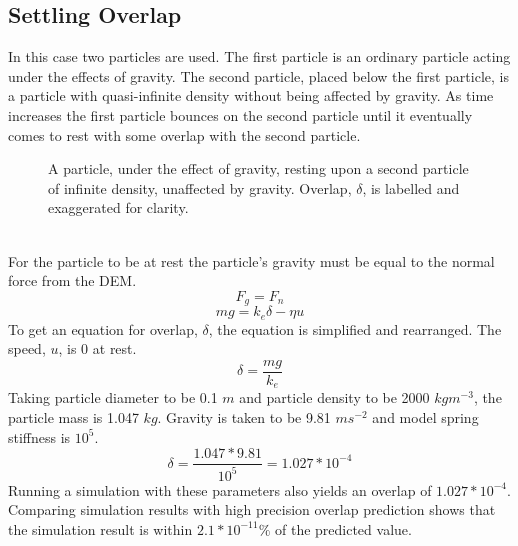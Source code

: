 \documentclass[10pt,a4paper,titlepage]{report}
\begin{document}
\subsection{Settling Overlap}
In this case two particles are used. The first particle is an ordinary particle acting under the effects of gravity. The second particle, placed below the first particle, is a particle with quasi-infinite density without being affected by gravity. As time increases the first particle bounces on the second particle until it eventually comes to rest with some overlap with the second particle.\\
\begin{figure}[!htb]
\centering
{}
\caption{A particle, under the effect of gravity, resting upon a second particle of infinite density, unaffected by gravity. Overlap, $\delta$, is labelled and exaggerated for clarity.}
\end{figure}
\\For the particle to be at rest the particle's gravity must be equal to the normal force from the DEM.
\begin{equation}
F_{g} = F_{n}
\end{equation}
\begin{equation}
mg = k_{e}\delta - \eta u
\end{equation}
To get an equation for overlap, $\delta$, the equation is simplified and rearranged. The speed, $u$, is 0 at rest.
\begin{equation}
\delta = \dfrac{mg}{k_{e}}
\end{equation} 
Taking particle diameter to be 0.1 $m$ and particle density to be 2000 $kg m^{-3}$, the particle mass is 1.047 $kg$. Gravity is taken to be 9.81 $m s^{-2}$ and model spring stiffness is $10^{5}$.
\begin{equation}
\delta = \dfrac{1.047 * 9.81}{10^{5}} = 1.027 * 10^{-4}
\end{equation} 
Running a simulation with these parameters also yields an overlap of $1.027 * 10^{-4}$. Comparing simulation results with high precision overlap prediction shows that the simulation result is within $2.1 * 10^{-11}\%$ of the predicted value.
\end{document}
